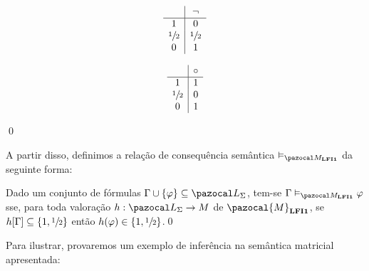 \begin{definicao}
            \vspace{0.5cm}

            \begin{minipage}{0.4\textwidth}
                \[
                    \begin{array}{c|c}%
                                    & \neg        \\
                        \hline%
                        1           & 0           \\
                        \meio{} & \meio{} \\
                        0           & 1           \\
                    \end{array}
                \]
            \end{minipage}
            \begin{minipage}{0.3\textwidth}
                \[
                    \begin{array}{c|c}%
                                    & \circ   \\
                        \hline%
                        1           & 1         \\
                        \meio{} & 0         \\
                        0           & 1         \\
                    \end{array}
                \]
            \end{minipage}

            \vspace{\baselineskip}
            \qed{}
        \end{definicao}

        A partir disso, definimos a relação de consequência semântica $\conmat$ da seguinte forma:

        \begin{definicao}\label{def:conmat}
            Dado um conjunto de fórmulas $\Gamma \cup \{\phi\} \subseteq \ling{}$, tem-se $\Gamma \conmat \phi$ sse, para toda valoração $h : \ling{} \to M$ de $\pazocal{M}_{\lfium{}}$, se $h[\Gamma] \subseteq \{1, \sfrac{1}{2}{}\}$ então $h(\varphi) \in \{1, \sfrac{1}{2}{}\}$.\qed{}
        \end{definicao}
        Para ilustrar, provaremos um exemplo de inferência na semântica matricial apresentada:

